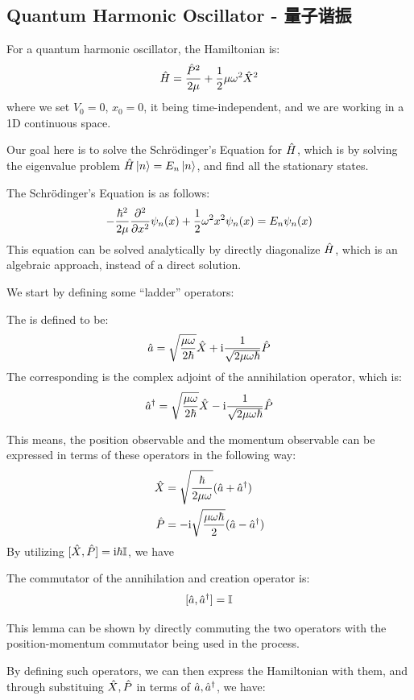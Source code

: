\subsection{Quantum Harmonic Oscillator - 量子谐振}
For a quantum harmonic oscillator, the Hamiltonian is:
$$\hat{H} = \frac{\hat{P}^2}{2\mu} + \frac{1}{2}\mu \omega^2 \hat{X}^2$$
where we set $V_0 = 0$, $x_0 = 0$, it being time-independent, and we are working in a 1D continuous space. \par
Our goal here is to solve the Schr\"odinger's Equation for $\hat{H}$, which is by solving the eigenvalue problem $\hat{H} \ket{n} = E_n \ket{n}$, and find all the stationary states. \par
The Schr\"odinger's Equation is as follows:
$$-\frac{\hbar^2}{2\mu} \pdv[2]{x}\psi_n(x) + \frac{1}{2}\omega^2 x^2 \psi_n(x) = E_n \psi_n(x)$$
This equation can be solved analytically by directly diagonalize $\hat{H}$, which is an algebraic approach, instead of a direct solution. \par
We start by defining some ``ladder'' operators:
\begin{definition}
    The  is defined to be:
    $$\hat{a} = \sqrt{\frac{\mu \omega}{2\hbar}}\hat{X} + \mathrm{i} \frac{1}{\sqrt{2\mu\omega\hbar}}\hat{P}$$
    The corresponding  is the complex adjoint of the annihilation operator, which is:
    $$\hat{a}^{\dagger} = \sqrt{\frac{\mu \omega}{2\hbar}}\hat{X} - \mathrm{i} \frac{1}{\sqrt{2\mu\omega\hbar}}\hat{P}$$
\end{definition}
This means, the position observable and the momentum observable can be expressed in terms of these operators in the following way:
\begin{align*}
    \hat{X} &= \sqrt{\frac{\hbar}{2\mu\omega}}(\hat{a} + \hat{a}^{\dagger}) \\
    \hat{P} &= -\mathrm{i} \sqrt{\frac{\mu \omega \hbar}{2}}(\hat{a} - \hat{a}^{\dagger})
\end{align*}
By utilizing $[\hat{X}, \hat{P}] = \mathrm{i} \hbar \mathbb{I}$, we have
\begin{lemma}
    The commutator of the annihilation and creation operator is:
    $$[\hat{a}, \hat{a}^{\dagger}] = \mathbb{I}$$
\end{lemma}
This lemma can be shown by directly commuting the two operators with the position-momentum commutator being used in the process. \par
By defining such operators, we can then express the Hamiltonian with them, and through substituing $\hat{X}, \hat{P}$ in terms of $\hat{a}, \hat{a}^{\dagger}$, we have:
